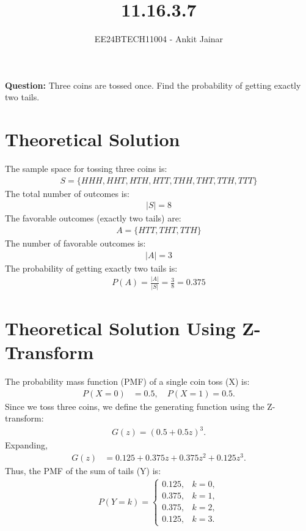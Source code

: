 \documentclass[journal]{IEEEtran}
\begin{document}
\title{11.16.3.7}
\author{EE24BTECH11004 - Ankit Jainar}
\maketitle

\textbf{Question:}
Three coins are tossed once. Find the probability of getting exactly two tails.

\section*{Theoretical Solution}
The sample space for tossing three coins is:
\begin{align}
    S = \{HHH, HHT, HTH, HTT, THH, THT, TTH, TTT\}
\end{align}
The total number of outcomes is:
\begin{align}
    |S| = 8
\end{align}
The favorable outcomes (exactly two tails) are:
\begin{align}
    A = \{HTT, THT, TTH\}
\end{align}
The number of favorable outcomes is:
\begin{align}
    |A| = 3
\end{align}
The probability of getting exactly two tails is:
\begin{align}
    P(A) = \frac{|A|}{|S|} = \frac{3}{8} = 0.375
\end{align}
\section*{Theoretical Solution Using Z-Transform}
The probability mass function (PMF) of a single coin toss (X) is:
\begin{align}
    P(X = 0) &= 0.5, \quad P(X = 1) = 0.5.
\end{align}
Since we toss three coins, we define the generating function using the Z-transform:
\begin{align}
    G(z) = (0.5 + 0.5z)^3.
\end{align}
Expanding,
\begin{align}
    G(z) &= 0.125 + 0.375z + 0.375z^2 + 0.125z^3.
\end{align}
Thus, the PMF of the sum of tails (Y) is:
\begin{align}
    P(Y = k) = \begin{cases} 
    0.125, & k = 0, \\
    0.375, & k = 1, \\
    0.375, & k = 2, \\
    0.125, & k = 3.
    \end{cases}
\end{align}
\end{document}
